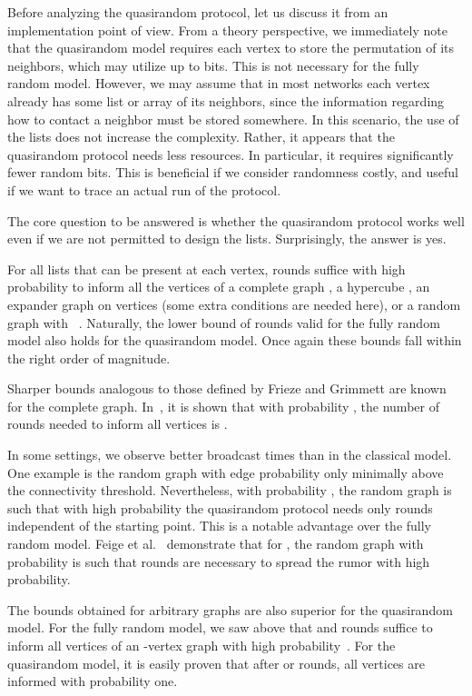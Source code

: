 \documentclass[12pt]{article}
\begin{document}
{Before analyzing the quasirandom protocol, let us discuss it from an implementation
point of view. From a theory perspective, we immediately note that the quasirandom model requires each
vertex to store the permutation of its neighbors, which may utilize up to  bits.
This is not necessary for the fully random model. However, we may assume that in
most networks each vertex already has some list or array of its neighbors, since the
information regarding how to contact a neighbor must be stored somewhere. In this scenario, the use of the lists does not increase the complexity. Rather, it appears that the
quasirandom protocol needs less resources. In particular, it requires significantly fewer random
bits. This is beneficial if we consider randomness costly, and useful if we want to trace an
actual run of the protocol.

The core question to be answered is whether the quasirandom protocol
works well even if we are not permitted to design the lists. Surprisingly, the answer
is yes.

For all lists that can be present at each vertex,  rounds suffice with high probability to inform all the vertices of a complete graph , a hypercube , an expander graph on  vertices (some extra conditions are needed here), or a random graph  with ~\cite{DFS08,DFS09}. Naturally, the lower bound of  rounds valid for the fully random model also holds for the quasirandom model. Once again these bounds fall within the right order of magnitude. 

Sharper bounds analogous to those defined by Frieze and Grimmett are known for the complete graph.
In~\cite{TightBounds}, it is shown that with probability , the number of rounds needed to inform all vertices is . 

In some settings, we observe better broadcast times than in the classical model. One example is the random graph with edge probability  only minimally above the connectivity threshold. Nevertheless, with probability , the random graph is such that with high probability the quasirandom protocol needs only  rounds independent of the starting point. This is a notable advantage over the fully random model. Feige et al.~\cite{FPRU90} demonstrate that for , the random graph with probability  is such that  rounds are necessary to spread the rumor with high probability. 

The bounds obtained for arbitrary graphs are also superior for the quasirandom model. For the fully random model, we saw above that  and  rounds suffice to inform all vertices of an -vertex graph  with high probability~\cite{FPRU90}. For the quasirandom model, it is easily proven that after  or  rounds, all vertices are informed with probability one. 

}
\end{document}
